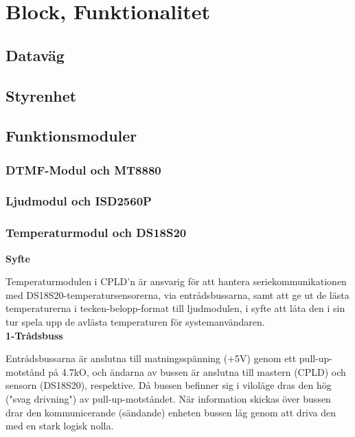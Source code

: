\documentclass[a4paper,11pt]{article}
\begin{document}
\section{Block, Funktionalitet}

	\subsection{Dataväg}

	\subsection{Styrenhet}

	\subsection{Funktionsmoduler}

		\subsubsection{DTMF-Modul och MT8880}
	
		\subsubsection{Ljudmodul och ISD2560P}

		\subsubsection{Temperaturmodul och DS18S20}

{\bf Syfte}

Temperaturmodulen i CPLD'n är ansvarig för att hantera seriekommunikationen med 
DS18S20-temperatursensorerna, via entrådsbussarna, samt att ge ut de lästa temperaturerna
i tecken-belopp-format till ljudmodulen, i syfte att låta den i sin tur spela upp de avlästa
temperaturen för systemanvändaren.\\

{\noindent \bf 1-Trådsbuss}

Entrådsbussarna är anslutna till matningsspänning (+5V) genom ett pull-up-motstånd på 4.7kO, och
ändarna av bussen är anslutna till mastern (CPLD) och sensorn (DS18S20), respektive. Då bussen
befinner sig i viloläge dras den hög ("svag drivning") av pull-up-motståndet. När information
skickas över bussen drar den kommunicerande (sändande) enheten bussen låg genom att driva den
med en stark logisk nolla.\\
\end{document}
